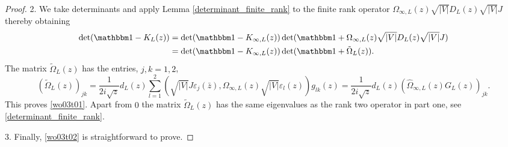 \begin{proof}
2.
We take determinants and apply Lemma \ref{determinant_finite_rank} to the finite rank operator 
$\Omega_{\infty,L}(z)\sqrt{|V|}D_L(z)\sqrt{|V|}J$ thereby obtaining
\begin{equation*}
\begin{split}
  \det(\id- K_L(z))
     & = \det(\id-K_{\infty,L}(z)) \det(\id+\Omega_{\infty,L}(z)\sqrt{|V|}D_L(z)\sqrt{|V|}J)\\
     & = \det(\id-K_{\infty,L}(z)) \det(\id+\tilde\Omega_L(z)) .
\end{split}
\end{equation*}
The matrix $\tilde\Omega_L(z)$ has the entries, $j,k=1,2$,
\begin{equation*}
  (\tilde\Omega_L(z))_{jk}
     = \frac{1}{2i\sqrt{z}}d_L(z)\sum_{l=1}^2 (\sqrt{|V|}J\varepsilon_j(\bar z),\Omega_{\infty,L}(z)\sqrt{|V|}\varepsilon_l(z))g_{lk}(z)
     = \frac{1}{2i\sqrt{z}}d_L(z)(\hat\Omega_{\infty,L}(z)G_L(z))_{jk} .
\end{equation*}
This proves \eqref{wo03t01}. Apart from $0$ the matrix $\tilde\Omega_L(z)$ has the same eigenvalues
as the rank two operator in part one, see \ref{determinant_finite_rank}. 

3.
Finally, \eqref{wo03t02} is straightforward to prove.
\end{proof}
